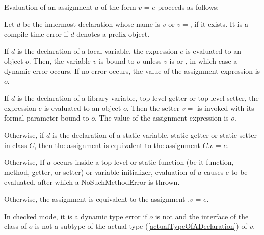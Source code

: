 \documentclass{article}
\newcommand{\code}[1]{{\sf #1}}
\begin{document}
\begin{itemize}
\LMHash{}
Evaluation of an assignment $a$ of the form $v$ \code{=} $e$ proceeds as follows:




\LMHash{}
Let $d$ be the innermost declaration whose name is $v$ or $v=$, if it exists.
It is a compile-time error if $d$ denotes a prefix object.

\LMHash{}
If $d$ is the declaration of a local variable, the expression $e$ is evaluated to an object $o$. Then, the variable $v$ is bound to $o$ unless $v$ is \FINAL{} or \CONST{}, in which case a dynamic error occurs.
If no error occurs, the value of the assignment expression is $o$.


\LMHash{}
If $d$ is the declaration of a library variable, top level getter or top level setter, the expression $e$ is evaluated to an object $o$. Then the setter $v=$ is invoked with its formal parameter bound to $o$. The value of the assignment expression is $o$.

\LMHash{}
Otherwise, if $d$ is the declaration of a static variable, static getter or static setter in class $C$, then the assignment is equivalent to the assignment \code{$C.v$ = $e$}.

\LMHash{}
Otherwise, If  $a$ occurs inside a top level or static function (be it function, method, getter,  or setter) or variable initializer, evaluation of $a$ causes $e$ to be evaluated, after which a \code{NoSuchMethodError} is thrown.

\LMHash{}
Otherwise, the assignment is equivalent to the assignment \code{ \THIS{}.$v$ = $e$}.

\LMHash{}
In checked mode, it is a dynamic type error if $o$ is not \NULL{} and the interface of the class of $o$ is not a subtype of the actual type (\ref{actualTypeOfADeclaration}) of $v$.


\end{itemize}
\end{document}
